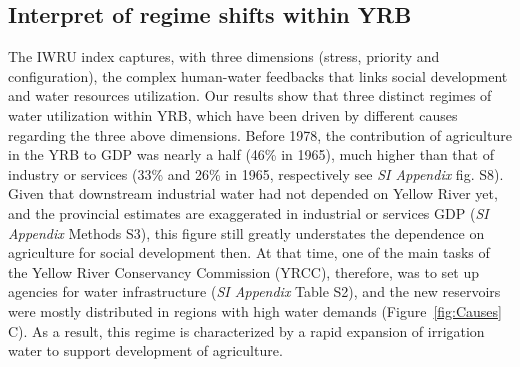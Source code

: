 \documentclass[9pt, twocolumn, twoside, lineno]{pnas-new}
\begin{document}
\subsection*{Interpret of regime shifts within YRB}
The IWRU index captures, with three dimensions (stress, priority and configuration), the complex human-water feedbacks that links social development and water resources utilization. 
Our results show that three distinct regimes of water utilization within YRB, which have been driven by different causes regarding the three above dimensions.
Before 1978, the contribution of agriculture in the YRB to GDP was nearly a half (46\% in 1965), much higher than that of industry or services (33\% and 26\% in 1965, respectively see \textit{SI Appendix} fig. S8). 
Given that downstream industrial water had not depended on Yellow River yet, and the provincial estimates are exaggerated in industrial or services GDP (\textit{SI Appendix} Methods S3), this figure still greatly understates the dependence on agriculture for social development then.
At that time, one of the main tasks of the Yellow River Conservancy Commission (YRCC), therefore, was to set up agencies for water infrastructure (\textit{SI Appendix} Table S2), and the new reservoirs were mostly distributed in regions with high water demands (Figure~\ref{fig:Causes} C). 
As a result, this regime is characterized by a rapid expansion of irrigation water to support development of agriculture.
\end{document}
